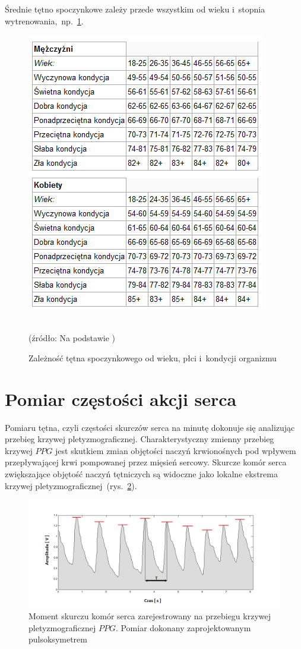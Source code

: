 Średnie tętno spoczynkowe zależy przede wszystkim od wieku i~stopnia wytrenowania,~np.~\ref{rys:TetnoTabela}.
\begin{figure}[ht]
	\centerline{\includegraphics[scale = 1.1]{graphic/TetnoTabela}}
	\caption{Zależność tętna spoczynkowego od wieku, płci i~kondycji organizmu}
	\label{rys:TetnoTabela}
	~\\	
	(źródło: Na podstawie \cite{SzGa11})
\end{figure}


\section{Pomiar częstości akcji serca}
\label{sec:Puls}

Pomiaru tętna, czyli częstości skurczów serca na minutę dokonuje się analizując przebieg krzywej pletyzmograficznej.
Charakterystyczny zmienny przebieg krzywej $PPG$ jest skutkiem zmian objętości naczyń krwionośnych pod wpływem przepływającej krwi pompowanej przez mięsień 
sercowy. Skurcze komór serca zwiększające objętość naczyń tętniczych są widoczne jako lokalne ekstrema krzywej pletyzmograficznej~(rys.~\ref{rys:MAX}).
\begin{figure}[!ht]
	\centerline{\includegraphics[scale = 0.58]{graphic/MAX}}
	\caption{Moment skurczu komór serca zarejestrowany na przebiegu krzywej pletyzmograficznej $PPG$. Pomiar dokonany zaprojektowanym pulsoksymetrem}
	\label{rys:MAX}
\end{figure}

